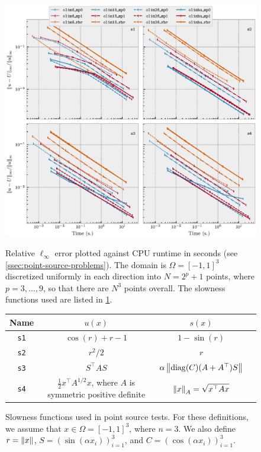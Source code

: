 \documentclass[sisc-eikonal.tex]{subfiles}
\begin{document}
\begin{figure}
  \centering
  \includegraphics{time_vs_error_3d.eps}
  \caption{Relative $\ell_\infty$ error plotted against CPU runtime in
    seconds (see \cref{ssec:point-source-problems}). The domain is
    $\Omega = [-1, 1]^3$ discretized uniformly in each direction into
    $N = 2^p + 1$ points, where $p = 3, \hdots, 9$, so that there are
    $N^3$ points overall. The slowness functions used are listed in
    \cref{table:slowness-functions}.}\label{fig:time-vs-error}
  \begin{tabular}{cccc}
    Name & $u(x)$ & $s(x)$ \\
    \midrule
    \texttt{s1} & $\cos(r) + r - 1$ & $1 - \sin(r)$ \\
    \texttt{s2} & $r^2/2$ & $r$ \\
    \texttt{s3} & $S^\top A S$ & $\alpha\left\|\operatorname{diag}(C){(A + A^\top)}S\right\|$ \\
    \texttt{s4} & $\tfrac{1}{2} x^\top A^{1/2} x$, where $A$ is symmetric positive definite & $\left\|x\right\|_A = \sqrt{x^\top A x}$
  \end{tabular}
  \caption{Slowness functions used in point source tests. For these
    definitions, we assume that $x \in \Omega = [-1, 1]^3$, where
    $n = 3$. We also define $r = \left\|x\right\|$,
    $S = (\sin(\alpha x_i))_{i=1}^3$, and
    $C = (\cos(\alpha x_i))_{i=1}^3$.}\label{table:slowness-functions}
\end{figure}
\end{document}
